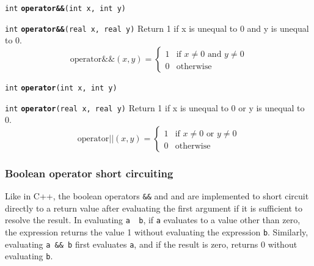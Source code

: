 \documentclass[
  10pt,
]{book}
\begin{document}

\texttt{int} \textbf{\texttt{operator\&\&}}\texttt{(int\ x,\ int\ y)}\newline


\texttt{int} \textbf{\texttt{operator\&\&}}\texttt{(real\ x,\ real\ y)}\newline
Return 1 if x is unequal to 0 and y is unequal to 0. \[
\mathrm{operator\&\&}(x,y) = \begin{cases} 1 & \text{if $x \neq 0$}
\text{ and } y \neq 0\\ 0 & \text{otherwise} \end{cases} \]


\texttt{int} \textbf{\texttt{operator\textbar{}\textbar{}}}\texttt{(int\ x,\ int\ y)}\newline


\texttt{int} \textbf{\texttt{operator\textbar{}\textbar{}}}\texttt{(real\ x,\ real\ y)}\newline
Return 1 if x is unequal to 0 or y is unequal to 0. \[
\text{operator||}(x,y) = \begin{cases} 1 & \text{if $x \neq 0$}
\textrm{ or } y \neq 0\\ 0 & \text{otherwise} \end{cases} \]

\hypertarget{boolean-operator-short-circuiting}{%
\subsubsection{Boolean operator short circuiting}\label{boolean-operator-short-circuiting}}

Like in C++, the boolean operators \texttt{\&\&} and \texttt{\textbar{}\textbar{}} and are implemented
to short circuit directly to a return value after evaluating the first
argument if it is sufficient to resolve the result. In evaluating \texttt{a\ \textbar{}\textbar{}\ b}, if \texttt{a} evaluates to a value other than zero, the expression
returns the value 1 without evaluating the expression \texttt{b}. Similarly,
evaluating \texttt{a\ \&\&\ b} first evaluates \texttt{a}, and if the result is zero,
returns 0 without evaluating \texttt{b}.
\end{document}
